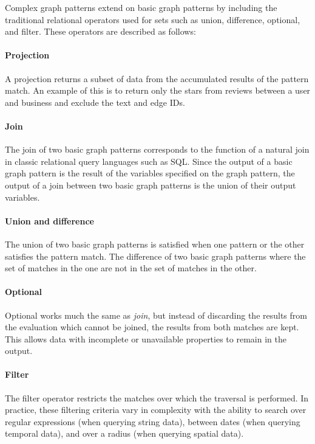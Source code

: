 Complex graph patterns extend on basic graph patterns by including the traditional relational operators used for sets such as union, difference, optional, and filter. These operators are described as follows:

\paragraph{Projection} A projection returns a subset of data from the accumulated results of the pattern match. An example of this is to return only the stars from reviews between a user and business and exclude the text and edge IDs.

\paragraph{Join} The join of two basic graph patterns corresponds to the function of a natural join in classic relational query languages such as SQL. Since the output of a basic graph pattern is the result of the variables specified on the graph pattern, the output of a join between two basic graph patterns is the union of their output variables.

\paragraph{Union and difference} The union of two basic graph patterns is satisfied when one pattern or the other satisfies the pattern match. The difference of two basic graph patterns where the set of matches in the one are not in the set of matches in the other.

\paragraph{Optional} Optional works much the same as \emph{join}, but instead of discarding the results from the evaluation which cannot be joined, the results from both matches are kept. This allows data with incomplete or unavailable properties to remain in the output.

\paragraph{Filter} The filter operator restricts the matches over which the traversal is performed. In practice, these filtering criteria vary in complexity with the ability to search over regular expressions (when querying string data), between dates (when querying temporal data), and over a radius (when querying spatial data).

